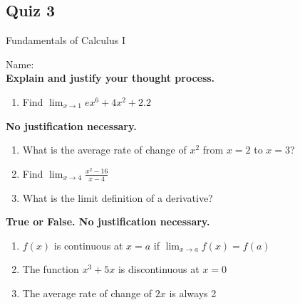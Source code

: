 \documentclass[a4paper, 12pt]{article}
\title{}
\date{}
\newcommand{\bt}[1]{\textbf{#1}} %
\begin{document}
\begin{center}
\section*{Quiz 3}
Fundamentals of Calculus I
\end{center}

Name: \underline{\hspace{5cm}} \\

\bt{Explain and justify your thought process.}

\begin{enumerate}
    \item Find $\lim_{x \rightarrow 1} ex^6 + 4x^2 + 2.2$
    \vspace{4cm}
\end{enumerate}

\bt{No justification necessary.}

\begin{enumerate}[resume]
    \item What is the average rate of change of $x^2$ from $x=2$ to $x=3$? 
    \vspace{2cm}
    \item Find $\lim_{x \rightarrow 4} \frac{x^2 - 16}{x-4}$
    \vspace{2cm}
    \item What is the limit definition of a derivative?
    \vspace{2cm}
\end{enumerate}

\bt{True or False. No justification necessary.}

\begin{enumerate}[resume]
    \item \underline{\hspace{1.5cm}} $f(x)$ is continuous at $x=a$ if $\lim_{x \rightarrow a} f(x) = f(a)$
    \item \underline{\hspace{1.5cm}} The function $x^3 + 5x$ is discontinuous at $x=0$
    \item \underline{\hspace{1.5cm}} The average rate of change of $2x$ is always 2
\end{enumerate}
\end{document}
